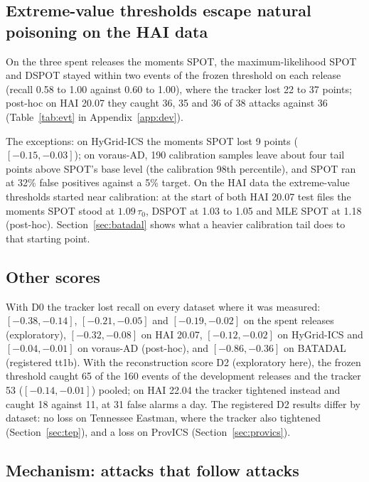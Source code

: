 \documentclass[sigconf,review,anonymous]{acmart}
\begin{document}
\subsection{Extreme-value thresholds escape natural poisoning on the HAI data}
\label{sec:evt}

On the three spent releases the moments SPOT, the maximum-likelihood SPOT and DSPOT stayed within two
events of the frozen threshold on each release (recall 0.58 to 1.00 against 0.60 to 1.00), where the tracker lost 22 to 37 points; post-hoc
on HAI 20.07 they caught 36, 35 and 36 of 38 attacks against 36 (Table~\ref{tab:evt} in
Appendix~\ref{app:dev}).

The exceptions: on HyGrid-ICS the moments SPOT lost 9 points ($[-0.15, -0.03]$); on voraus-AD, 190
calibration samples leave about four tail points above SPOT's base level (the calibration 98th
percentile), and SPOT ran at 32\% false positives against a 5\% target. On the HAI data the
extreme-value thresholds started near calibration: at the start of both HAI 20.07 test files the
moments SPOT stood at $1.09\,\tau_0$, DSPOT at 1.03 to 1.05 and MLE SPOT at 1.18 (post-hoc).
Section~\ref{sec:batadal} shows what a heavier calibration tail does to that starting point.

\subsection{Other scores}

With D0 the tracker lost recall on every dataset where it was measured: $[-0.38, -0.14]$,
$[-0.21, -0.05]$ and $[-0.19, -0.02]$ on the spent releases (exploratory), $[-0.32, -0.08]$ on HAI
20.07, $[-0.12, -0.02]$ on HyGrid-ICS and $[-0.04, -0.01]$ on voraus-AD (post-hoc), and
$[-0.86, -0.36]$ on BATADAL (registered tt1b). With the reconstruction score D2
(exploratory here), the frozen threshold caught 65 of the 160 events of the development releases and
the tracker 53 ($[-0.14, -0.01]$) pooled; on HAI 22.04 the tracker tightened instead and caught 18
against 11, at 31 false alarms a day. The registered D2 results differ by dataset: no loss on Tennessee
Eastman, where the tracker also tightened (Section~\ref{sec:tep}), and a loss on ProvICS
(Section~\ref{sec:provics}).

\subsection{Mechanism: attacks that follow attacks}
\end{document}

